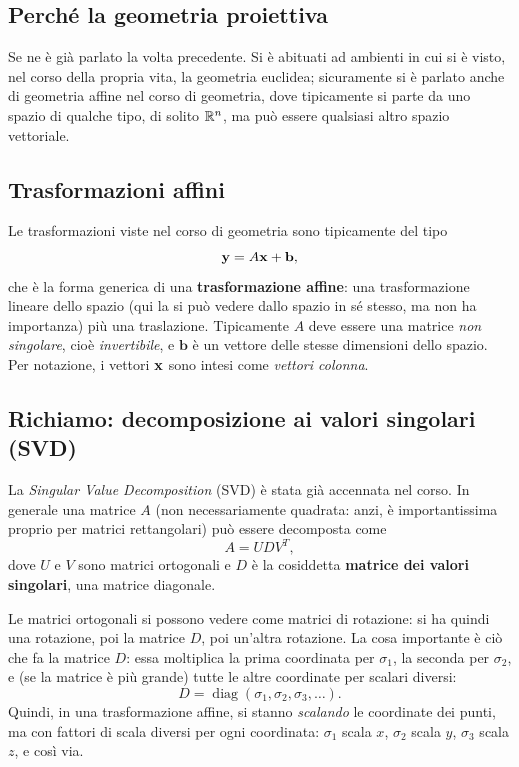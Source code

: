 \subsection{Perché la geometria proiettiva}

Se ne è già parlato la volta precedente. Si è abituati ad ambienti in cui si è visto, nel corso della propria vita, la geometria euclidea; sicuramente si è parlato anche di geometria affine nel corso di geometria, dove tipicamente si parte da uno spazio di qualche tipo, di solito $\mathbb{R}^n$, ma può essere qualsiasi altro spazio vettoriale.

\subsection{Trasformazioni affini}

Le trasformazioni viste nel corso di geometria sono tipicamente del tipo
\[
  \mathbf{y} = A\mathbf{x} + \mathbf{b},
\]
che è la forma generica di una \textbf{trasformazione affine}: una trasformazione lineare dello spazio (qui la si può vedere dallo spazio in sé stesso, ma non ha importanza) più una traslazione. Tipicamente $A$ deve essere una matrice \emph{non singolare}, cioè \emph{invertibile}, e $\mathbf{b}$ è un vettore delle stesse dimensioni dello spazio. Per notazione, i vettori $\mathbf{x}$ sono intesi come \emph{vettori colonna}.

\subsection{Richiamo: decomposizione ai valori singolari (SVD)}

La \emph{Singular Value Decomposition} (SVD) è stata già accennata nel corso. In generale una matrice $A$ (non necessariamente quadrata: anzi, è importantissima proprio per matrici rettangolari) può essere decomposta come
\[
  A = U D V^{T},
\]
dove $U$ e $V$ sono matrici ortogonali e $D$ è la cosiddetta \textbf{matrice dei valori singolari}, una matrice diagonale.

Le matrici ortogonali si possono vedere come matrici di rotazione: si ha quindi una rotazione, poi la matrice $D$, poi un'altra rotazione. La cosa importante è ciò che fa la matrice $D$: essa moltiplica la prima coordinata per $\sigma_1$, la seconda per $\sigma_2$, e (se la matrice è più grande) tutte le altre coordinate per scalari diversi:
\[
  D = \operatorname{diag}(\sigma_1,\sigma_2,\sigma_3,\dots).
\]
Quindi, in una trasformazione affine, si stanno \emph{scalando} le coordinate dei punti, ma con fattori di scala diversi per ogni coordinata: $\sigma_1$ scala $x$, $\sigma_2$ scala $y$, $\sigma_3$ scala $z$, e così via.

